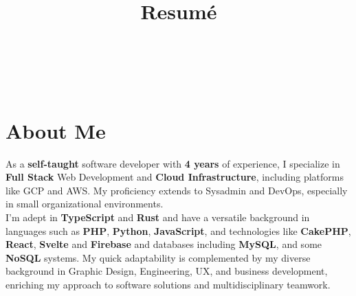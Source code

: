 \documentclass[11pt,a4paper,sans]{moderncv}
\title{Resumé}
\begin{document}
\setsansfont[
	BoldFont={HelveticaNeueLTCom-BdCn}
]{HelveticaNeueLTCom-LtCn}
\setmonofont{Fira Code}



\hfill \\[-2em]
\makecvtitle %
\hfill \\[-6em]


\section{About Me}

 { \flushleft As a \textbf{self-taught} software developer with \textbf{4 years} of experience, I specialize in \textbf{Full Stack} Web Development and \textbf{Cloud Infrastructure}, including platforms like GCP and AWS. My proficiency extends to Sysadmin and DevOps, especially in small organizational environments. \\ I'm adept in \textbf{TypeScript} and \textbf{Rust} and have a versatile background in languages such as \textbf{PHP}, \textbf{Python}, \textbf{JavaScript}, and technologies like \textbf{CakePHP}, \textbf{React}, \textbf{Svelte} and \textbf{Firebase} and databases including \textbf{MySQL}, and some \textbf{NoSQL} systems. My quick adaptability is complemented by my diverse background in Graphic Design, Engineering, UX, and business development, enriching my approach to software solutions and multidisciplinary teamwork. 

 }

\end{document}
